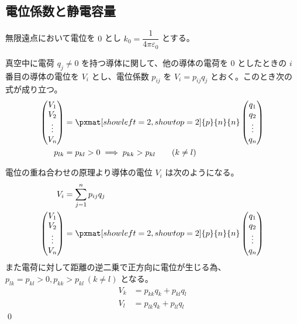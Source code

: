 \documentclass[uplatex,dvipdfmx,a4paper,11pt]{jlreq}
\makeatletter
\newcommand\mqty[1]{\begin{pmatrix}#1\end{pmatrix}}
\numberwithin{equation}{section}
\theoremstyle{definition}
\renewenvironment{proof}[1][\proofname]{\par
  \normalfont
  \topsep6\p@\@plus6\p@ \trivlist
  \item[\hskip\labelsep{\bfseries #1}\@addpunct{\bfseries}]\ignorespaces\quad\par
}{%
  \qed\endtrivlist\@endpefalse
}
\renewcommand\proofname{証明}
\makeatother
\begin{document}
\subsection{電位係数と静電容量}
無限遠点において電位を $0$ とし $k_0 = \dfrac{1}{4\pi\varepsilon_0}$ とする。
\begin{problem}
真空中に電荷 $q_j \neq 0$ を持つ導体に関して、他の導体の電荷を $0$ としたときの $i$ 番目の導体の電位を $V_i$ とし、電位係数 $p_{ij}$ を $V_i = p_{ij}q_j$ とおく。このとき次の式が成り立つ。
\begin{align}
  \mqty{V_1                                                       \\ V_2 \\ \vdots \\ V_n} & = \pxmat[showleft=2,showtop=2]{p}{n}{n}\mqty{q_1 \\ q_2 \\ \vdots \\ q_n} \\
  p_{lk} & = p_{kl} > 0 \implies p_{kk} > p_{kl} \qquad (k\neq l)
\end{align}
\end{problem}
\begin{proof}
  電位の重ね合わせの原理より導体の電位 $V_i$ は次のようになる。
  \begin{align}
    V_i & = \sum_{j=1}^{n}p_{ij}q_j \\
    \mqty{V_1                       \\ V_2 \\ \vdots \\ V_n} & = \pxmat[showleft=2,showtop=2]{p}{n}{n}\mqty{q_1 \\ q_2 \\ \vdots \\ q_n}
  \end{align}
  また電荷に対して距離の逆二乗で正方向に電位が生じる為、$p_{lk} = p_{kl} > 0, p_{kk} > p_{kl}\ (k\neq l)$ となる。
  \begin{align}
    V_k & = p_{kk}q_k + p_{kl}q_l \\
    V_l & = p_{lk}q_k + p_{ll}q_l
  \end{align}
\end{proof}
\end{document}
